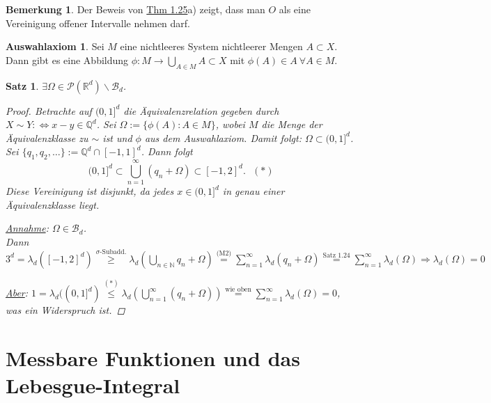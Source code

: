 \documentclass[a4paper]{report}
\newcommand{\PowerSet}{\mathcal{P}}
\newcommand{\R}{\mathbb{R}}
\newcommand{\N}{\mathbb{N}}
\newcommand{\Q}{\mathbb{Q}}
\newcommand{\Borel}{\mathcal{B}}
\newcommand{\Bd}{\Borel_d}
\newcommand{\jlabel}[1]{\label{j_#1}}
\newcommand{\jshortlink}[1]{\jhyperref{#1}{\text{#1}}}
\newcommand{\jhyperref}[2]{\hyperref[j_#1]{#2}}
\newcommand{\jlink}[1]{\jhyperref{#1}{#1}}
\newcommand{\jspacesmall}{\vspace{4pt}}
\theoremstyle{plain}
\newtheorem{satz}[thm]{Satz}
\theoremstyle{definition}
\newtheorem*{bem*}{Bemerkung}
\newtheorem*{auswahlaxiom}{Auswahlaxiom}
\begin{document}
{{{\begin{bem*}
    Der Beweis von \jlink{Thm 1.25}a) zeigt, dass man $O$ als eine Vereinigung offener Intervalle nehmen darf.
\end{bem*}

\begin{auswahlaxiom}
    Sei $M$ eine nichtleeres System nichtleerer Mengen $A\subset X$.\\
    Dann gibt es eine Abbildung $\phi: M \rightarrow \bigcup_{A\in M} A \subset X$ mit $\phi(A) \in A \ \forall A\in M$.
\end{auswahlaxiom}

\begin{satz}
\jlabel{Satz 1.26}
    $\exists \Omega \in \PowerSet(\R^d) \backslash \Bd$.
    \begin{proof}
        Betrachte auf $(0,1]^d$ die Äquivalenzrelation gegeben durch $X\sim Y :\Leftrightarrow x-y \in \Q^d$. Sei $\Omega := \{\phi(A) : A \in M\}$, wobei $M$ die Menge der Äquivalenzklasse zu $\sim$ ist und $\phi$ aus dem Auswahlaxiom. Damit folgt: $\Omega \subset (0,1]^d$.\\
        Sei $\{q_1, q_2, \dots\} := \Q^d \cap [-1,1]^d$. Dann folgt
        \begin{displaymath}
            (0,1]^d \subset \bigcup_{n=1}^\infty (q_n + \Omega) \subset [-1,2]^d. \ \ \ (*)
        \end{displaymath}
        Diese Vereinigung ist disjunkt, da jedes $x\in (0,1]^d$ in genau einer Äquivalenzklasse liegt.
        
        \jspacesmall
        
        \uline{Annahme}: $\Omega \in \Bd$.\\
            Dann $3^d = \lambda_d([-1,2]^d) \overset{\sigma\text{-Subadd.}}{\ge} \lambda_d(\bigcup_{n\in\N} q_n + \Omega) \overset{\text{(M2)}}{=} \sum_{n=1}^\infty \lambda_d(q_n + \Omega) \overset{\jshortlink{Satz 1.24}}{=} \sum_{n=1}^\infty \lambda_d(\Omega) \Rightarrow \lambda_d(\Omega) = 0$
            
        \jspacesmall
            
        \uline{Aber}: $1 = \lambda_d((0,1]^d) \overset{(*)}{\le} \lambda_d(\bigcup_{n=1}^\infty (q_n + \Omega)) \overset{\text{wie oben}}{=} \sum_{n=1}^\infty \lambda_d(\Omega) = 0$, was ein Widerspruch ist.
    \end{proof}
\end{satz}


\chapter{Messbare Funktionen und das Lebesgue-Integral}

}}}
\end{document}
